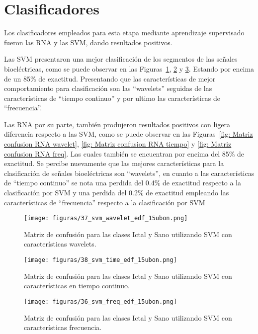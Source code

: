\section{Clasificadores}
Los clasificadores empleados para esta etapa mediante aprendizaje supervisado fueron las RNA y las SVM, dando resultados positivos. 

Las SVM presentaron una mejor clasificación de los segmentos de las  señales bioeléctricas, como se puede observar en las Figuras~\ref{fig: Matriz confusion svm wavelets}, \ref{fig: Matriz confusion svm time} y  \ref{fig: Matriz confusion svm freq}. Estando por encima de un 85\% de exactitud. Presentando que las características de mejor comportamiento para clasificación son las  ``wavelets'' seguidas de las características de ``tiempo continuo'' y por ultimo las características de ``frecuencia''.

Las RNA por su parte, también produjeron resultados positivos con ligera diferencia respecto a las SVM, como se puede observar en las Figuras~\ref{fig: Matriz confusion RNA wavelet}, \ref{fig: Matriz confusion RNA tiempo} y \ref{fig: Matriz confusion RNA freq}. Las cuales también se encuentran por encima del 85\% de exactitud. Se percibe nuevamente que las mejores características para la clasificación de señales bioeléctricas son ``wavelets'', en cuanto a las  características de ``tiempo continuo'' se nota una perdida del 0.4\% de exactitud respecto a la clasificación por SVM y una perdida del 0.2\% de exactitud empleando las características de ``frecuencia'' respecto a la clasificación por SVM

\begin{figure}[H]
    \centering
    \texttt{[image: figuras/37\_svm\_wavelet\_edf\_15ubon.png]}
    \caption{Matriz de confusión para las clases Ictal y Sano utilizando SVM con características wavelets.}
    \label{fig: Matriz confusion svm wavelets}
\end{figure}
\begin{figure}[H]
    \centering
    \texttt{[image: figuras/38\_svm\_time\_edf\_15ubon.png]}
    \caption{Matriz de confusión para las clases Ictal y Sano utilizando SVM con características en tiempo continuo.}
    \label{fig: Matriz confusion svm time}
\end{figure}
\begin{figure}[H]
    \centering
    \texttt{[image: figuras/36\_svm\_freq\_edf\_15ubon.png]}
    \caption{Matriz de confusión para las clases Ictal y Sano utilizando SVM con características frecuencia.}
    \label{fig: Matriz confusion svm freq}
\end{figure}

